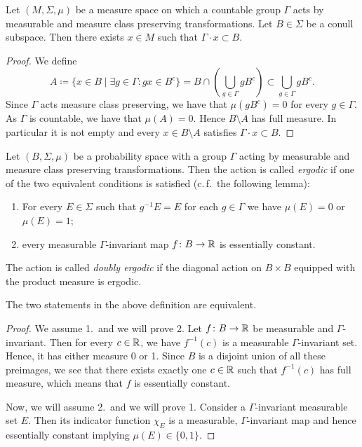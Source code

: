 \begin{lemma}
  \label{lem:countable-orbit}
  Let \((M, \Sigma, \mu)\) be a measure space on which a countable group \(\Gamma\) acts by measurable and measure class preserving transformations. Let \(B \in \Sigma\) be a conull subspace. Then there exists \(x \in M\) such that \(\Gamma \cdot x \subset B\).
\end{lemma}

\begin{proof}
  We define
  \[
    A \coloneqq \{x \in B \mid \exists g \in \Gamma\colon gx \in B^c\} = B \cap \left( \bigcup_{g \in \Gamma} gB^c\right) \subset \bigcup_{g \in \Gamma} gB^c.
  \]
  Since \(\Gamma\) acts measure class preserving, we have that \(\mu(gB^c) = 0\) for every \(g \in \Gamma\). As \(\Gamma\) is countable, we have that \(\mu(A) = 0\). Hence \(B \setminus A\) has full measure. In particular it is not empty and every \(x \in B \setminus A\) satisfies \(\Gamma \cdot x \subset B\).
\end{proof}

\begin{defin}
  Let \((B, \Sigma, \mu)\) be a probability space with a group \(\Gamma\) acting by measurable and measure class preserving transformations. Then the action is called \emph{ergodic} if one of the two equivalent conditions is satisfied (c.\,f.\ the following lemma):
  \begin{enumerate}
  \item For every \(E \in \Sigma\) such that \(g^{-1}E = E\) for each \(g \in \Gamma\) we have \(\mu(E) = 0\) or \(\mu(E) = 1\);
  \item every measurable \(\Gamma\)-invariant map \(f\colon B \to \mathbb{R}\) is essentially constant.
  \end{enumerate}
  The action is called \emph{doubly ergodic} if the diagonal action on \(B \times B\) equipped with the product measure is ergodic.
\end{defin}

\begin{lemma}
  The two statements in the above definition are equivalent.
\end{lemma}

\begin{proof}
  We assume 1.\ and we will prove 2. Let \(f \colon B \to \mathbb{R}\) be measurable and \(\Gamma\)-invariant. Then for every \(c \in \mathbb{R}\), we have \(f^{-1}(c)\) is a measurable \(\Gamma\)-invariant set. Hence, it has either measure 0 or 1. Since \(B\) is a disjoint union of all these preimages, we see that there exists exactly one \(c \in \mathbb{R}\) such that \(f^{-1}(c)\) has full measure, which means that \(f\) is essentially constant.

  Now, we will assume 2.\ and we will prove 1. Consider a \(\Gamma\)-invariant measurable set \(E\). Then its indicator function \(\chi_E\) is a measurable, \(\Gamma\)-invariant map and hence essentially constant implying \(\mu(E) \in \{0,1\}\).
\end{proof}

